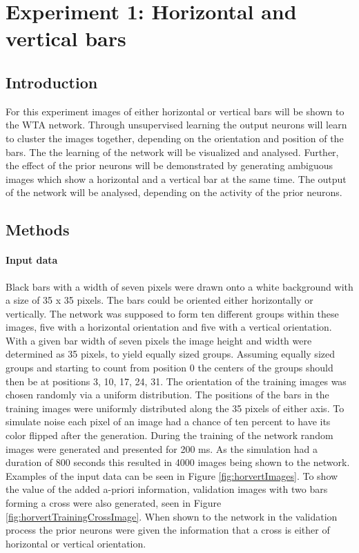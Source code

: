\section{Experiment 1: Horizontal and vertical bars}
\label{section:horvertAdaptiveInhibition}

\subsection{Introduction}

For this experiment images of either horizontal or vertical bars will be shown to the WTA network. Through unsupervised learning the output neurons will learn to cluster the images together, depending on the orientation and position of the bars. The the learning of the network will be visualized and analysed.
Further, the effect of the prior neurons will be demonstrated by generating ambiguous images which show a horizontal and a vertical bar at the same time. The output of the network will be analysed, depending on the activity of the prior neurons. 

\subsection{Methods}

\paragraph{Input data}
Black bars with a width of seven pixels were drawn onto a white background with a size of 35 x 35 pixels. The bars could be oriented either horizontally or vertically. The network was supposed to form ten different groups within these images, five with a horizontal orientation and five with a vertical orientation. With a given bar width of seven pixels the image height and width were determined as 35 pixels, to yield equally sized groups. Assuming equally sized groups and starting to count from position 0 the centers of the groups should then be at positions 3, 10, 17, 24, 31. The orientation of the training images was chosen randomly via a uniform distribution. The positions of the bars in the training images were uniformly distributed along the 35 pixels of either axis. To simulate noise each pixel of an image had a chance of ten percent to have its color flipped after the generation.
During the training of the network random images were generated and presented for 200 ms. As the simulation had a duration of 800 seconds this resulted in 4000 images being shown to the network. Examples of the input data can be seen in Figure \ref{fig:horvertImages}. To show the value of the added a-priori information, validation images with two bars forming a cross were also generated, seen in Figure \ref{fig:horvertTrainingCrossImage}. When shown to the network in the validation process the prior neurons were given the information that a cross is either of horizontal or vertical orientation.

